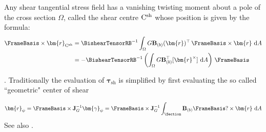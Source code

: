 \begin{proposition}
Any shear tangential stress field has a vanishing twisting moment about a pole of the cross section $\Omega$, called the shear centre $\mathrm{C}^{\rm sh}$ whose position is given by the formula:
$$
\begin{aligned}
\FrameBasis\times\bm{r}_{\mathrm{C}^{\rm sh}}
&=\BishearTensorRB^{-1} \int_{\Omega} G\mathbf{B}_{(b)}(\bm{r})^{\top}\, \FrameBasis\times \bm{r}\mathrm{~d}A \\
&=-\BishearTensorRB^{-1} \left(\int_{\Omega} G\mathbf{B}_{(b)}^{\top} [\bm{r}^{\times}]\mathrm{~d}A\right)\,\FrameBasis
\end{aligned}
$$
\end{proposition}

\cite{paradiso2019consistent}. 
Traditionally the evaluation of $\bm{\tau}_{\mathrm{sh}}$ is simplified by first evaluating the so called ``geometric" center of shear

\begin{equation}
\bm{r}_\psi=\FrameBasis \times \mathbf{J}_G^{-1} \bm{\gamma}_\psi=\FrameBasis \times \mathbf{J}_G^{-1} \int_{\Section} \mathbf{B}_{(b)} \FrameBasis?\times\bm{r} \mathrm{~d}A
\label{eq:para-47}
\end{equation}
See also \cite{elter1983two}.


